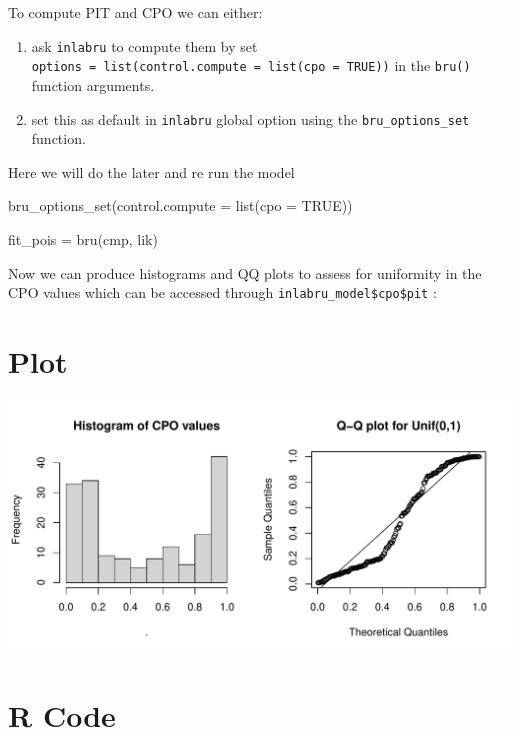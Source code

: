 \documentclass[
  letterpaper,
  DIV=11,
  numbers=noendperiod]{scrartcl}
\newenvironment{Shaded}{\begin{snugshade}}{\end{snugshade}}
\newcommand{\AttributeTok}[1]{\textcolor[rgb]{0.40,0.45,0.13}{#1}}
\newcommand{\ConstantTok}[1]{\textcolor[rgb]{0.56,0.35,0.01}{#1}}
\newcommand{\FunctionTok}[1]{\textcolor[rgb]{0.28,0.35,0.67}{#1}}
\newcommand{\NormalTok}[1]{\textcolor[rgb]{0.00,0.23,0.31}{#1}}
\newcommand{\OtherTok}[1]{\textcolor[rgb]{0.00,0.23,0.31}{#1}}
\begin{document}
To compute PIT and CPO we can either:

\begin{enumerate}
\def\labelenumi{\arabic{enumi}.}
\item
  ask \texttt{inlabru} to compute them by set
  \texttt{options\ =\ list(control.compute\ =\ list(cpo\ =\ TRUE))} in
  the \texttt{bru()} function arguments.
\item
  set this as default in \texttt{inlabru} global option using the
  \texttt{bru\_options\_set} function.
\end{enumerate}

Here we will do the later and re run the model

\begin{Shaded}
\begin{Highlighting}[]
\FunctionTok{bru\_options\_set}\NormalTok{(}\AttributeTok{control.compute =} \FunctionTok{list}\NormalTok{(}\AttributeTok{cpo =} \ConstantTok{TRUE}\NormalTok{))}

\NormalTok{fit\_pois }\OtherTok{=} \FunctionTok{bru}\NormalTok{(cmp, lik)}
\end{Highlighting}
\end{Shaded}

Now we can produce histograms and QQ plots to assess for uniformity in
the CPO values which can be accessed through
\texttt{inlabru\_model\$cpo\$pit} :

\section{Plot}

\begin{center}
\includegraphics{day1_practical_2_files/figure-pdf/unnamed-chunk-32-1.pdf}
\end{center}

\section{R Code}
\end{document}
